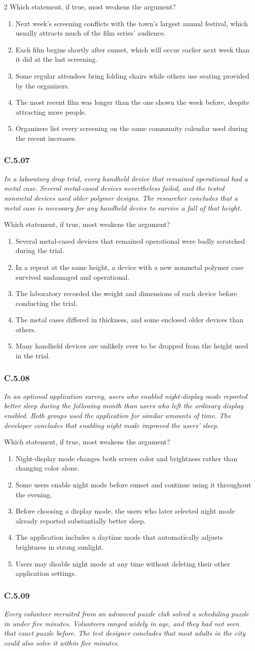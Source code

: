 \documentclass[10pt]{extarticle}
\newcommand{\choice}[1]{\item #1}
\newcommand{\bankitem}[1]{\subsubsection*{#1}}
\begin{document}
\begin{multicols}{2}
Which statement, if true, most weakens the argument?
\begin{enumerate}[label=(\alph*)]
  \choice{Next week's screening conflicts with the town's largest annual festival, which usually attracts much of the film series' audience.}
  \choice{Each film begins shortly after sunset, which will occur earlier next week than it did at the last screening.}
  \choice{Some regular attendees bring folding chairs while others use seating provided by the organizers.}
  \choice{The most recent film was longer than the one shown the week before, despite attracting more people.}
  \choice{Organizers list every screening on the same community calendar used during the recent increases.}
\end{enumerate}
\bankitem{C.5.07}
\emph{In a laboratory drop trial, every handheld device that remained operational had a metal case. Several metal-cased devices nevertheless failed, and the tested nonmetal devices used older polymer designs. The researcher concludes that a metal case is necessary for any handheld device to survive a fall of that height.}

Which statement, if true, most weakens the argument?
\begin{enumerate}[label=(\alph*)]
  \choice{Several metal-cased devices that remained operational were badly scratched during the trial.}
  \choice{In a repeat at the same height, a device with a new nonmetal polymer case survived undamaged and operational.}
  \choice{The laboratory recorded the weight and dimensions of each device before conducting the trial.}
  \choice{The metal cases differed in thickness, and some enclosed older devices than others.}
  \choice{Many handheld devices are unlikely ever to be dropped from the height used in the trial.}
\end{enumerate}
\bankitem{C.5.08}
\emph{In an optional application survey, users who enabled night-display mode reported better sleep during the following month than users who left the ordinary display enabled. Both groups used the application for similar amounts of time. The developer concludes that enabling night mode improved the users' sleep.}

Which statement, if true, most weakens the argument?
\begin{enumerate}[label=(\alph*)]
  \choice{Night-display mode changes both screen color and brightness rather than changing color alone.}
  \choice{Some users enable night mode before sunset and continue using it throughout the evening.}
  \choice{Before choosing a display mode, the users who later selected night mode already reported substantially better sleep.}
  \choice{The application includes a daytime mode that automatically adjusts brightness in strong sunlight.}
  \choice{Users may disable night mode at any time without deleting their other application settings.}
\end{enumerate}
\bankitem{C.5.09}
\emph{Every volunteer recruited from an advanced puzzle club solved a scheduling puzzle in under five minutes. Volunteers ranged widely in age, and they had not seen that exact puzzle before. The test designer concludes that most adults in the city could also solve it within five minutes.}


\end{multicols}
\end{document}
